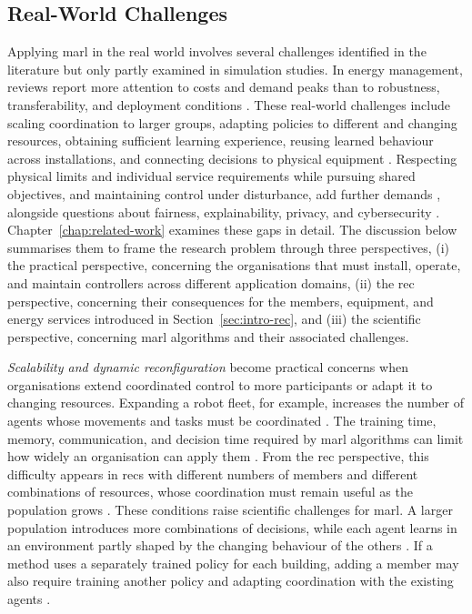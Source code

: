 \subsection{Real-World Challenges}
\label{sec:intro-challenges}

Applying \gls{marl} in the real world involves several challenges identified in the literature but only partly examined in simulation studies. In energy management, reviews report more attention to costs and demand peaks than to robustness, transferability, and deployment conditions \parencite{keren2024energynetworks,sajid2026marldrreview}. These real-world challenges include scaling coordination to larger groups, adapting policies to different and changing resources, obtaining sufficient learning experience, reusing learned behaviour across installations, and connecting decisions to physical equipment \parencite{gronauer2022survey,orr2023multirobot,kannari2025realbuildings}. Respecting physical limits and individual service requirements while pursuing shared objectives, and maintaining control under disturbance, add further demands \parencite{gu2023safemarl,dulacarnold2021realworld}, alongside questions about fairness, explainability, privacy, and cybersecurity \parencite{moret2019energycollectives,bekkemoen2024xrl,farokhi2020smartmeterprivacy,stouffer2023otsecurity}. Chapter~\ref{chap:related-work} examines these gaps in detail. The discussion below summarises them to frame the research problem through three perspectives, (i) the practical perspective, concerning the organisations that must install, operate, and maintain controllers across different application domains, (ii) the \gls{rec} perspective, concerning their consequences for the members, equipment, and energy services introduced in Section~\ref{sec:intro-rec}, and (iii) the scientific perspective, concerning \gls{marl} algorithms and their associated challenges.

\emph{Scalability and dynamic reconfiguration} become practical concerns when organisations extend coordinated control to more participants or adapt it to changing resources. Expanding a robot fleet, for example, increases the number of agents whose movements and tasks must be coordinated \parencite{orr2023multirobot}. The training time, memory, communication, and decision time required by \gls{marl} algorithms can limit how widely an organisation can apply them \parencite{charbonnier2022scalable}. From the \gls{rec} perspective, this difficulty appears in \glspl{rec} with different numbers of members and different combinations of resources, whose coordination must remain useful as the population grows \parencite{almilaify2023scalex}. These conditions raise scientific challenges for \gls{marl}. A larger population introduces more combinations of decisions, while each agent learns in an environment partly shaped by the changing behaviour of the others \parencite{gronauer2022survey,orr2023multirobot}. If a method uses a separately trained policy for each building, adding a member may also require training another policy and adapting coordination with the existing agents \parencite{wu2024dynamicvpp}.

